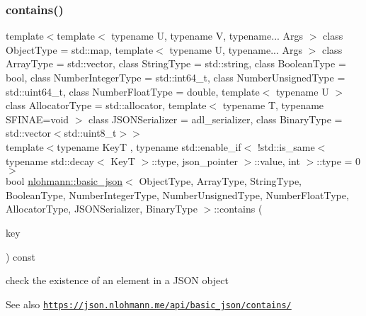 \subsubsection{\texorpdfstring{contains()}{contains()}\hspace{0.1cm}{\footnotesize\ttfamily [1/2]}}
{\footnotesize\ttfamily template$<$template$<$ typename U, typename V, typename... Args $>$ class Object\+Type = std\+::map, template$<$ typename U, typename... Args $>$ class Array\+Type = std\+::vector, class String\+Type  = std\+::string, class Boolean\+Type  = bool, class Number\+Integer\+Type  = std\+::int64\+\_\+t, class Number\+Unsigned\+Type  = std\+::uint64\+\_\+t, class Number\+Float\+Type  = double, template$<$ typename U $>$ class Allocator\+Type = std\+::allocator, template$<$ typename T, typename S\+F\+I\+N\+A\+E=void $>$ class J\+S\+O\+N\+Serializer = adl\+\_\+serializer, class Binary\+Type  = std\+::vector$<$std\+::uint8\+\_\+t$>$$>$ \\
template$<$typename KeyT , typename std\+::enable\+\_\+if$<$ !std\+::is\+\_\+same$<$ typename std\+::decay$<$ Key\+T $>$\+::type, json\+\_\+pointer $>$\+::value, int $>$\+::type  = 0$>$ \\
bool \hyperlink{classnlohmann_1_1basic__json}{nlohmann\+::basic\+\_\+json}$<$ Object\+Type, Array\+Type, String\+Type, Boolean\+Type, Number\+Integer\+Type, Number\+Unsigned\+Type, Number\+Float\+Type, Allocator\+Type, J\+S\+O\+N\+Serializer, Binary\+Type $>$\+::contains (\begin{DoxyParamCaption}\item[{KeyT \&\&}]{key }\end{DoxyParamCaption}) const\hspace{0.3cm}{\ttfamily [inline]}}



check the existence of an element in a J\+S\+ON object 

\begin{DoxySeeAlso}{See also}
\href{https://json.nlohmann.me/api/basic_json/contains/}{\tt https\+://json.\+nlohmann.\+me/api/basic\+\_\+json/contains/} 
\end{DoxySeeAlso}
\mbox{\label{classnlohmann_1_1basic__json_adb82c1f34c73486e013da71ae369e597}} 
